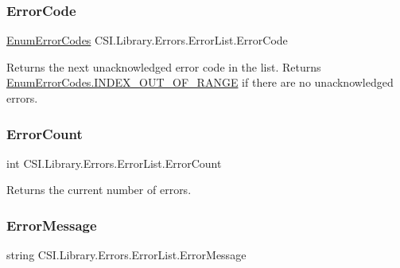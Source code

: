 \mbox{\label{class_c_s_i_1_1_library_1_1_errors_1_1_error_list_a08cc2b3cca8c52820e6258e0b14b7134}} 
\subsubsection{\texorpdfstring{ErrorCode}{ErrorCode}}
{\footnotesize\ttfamily \mbox{\hyperlink{namespace_c_s_i_1_1_library_1_1_errors_a5534735de1ef2256eb4c52c7440e30d7}{Enum\+Error\+Codes}} C\+S\+I.\+Library.\+Errors.\+Error\+List.\+Error\+Code\hspace{0.3cm}{\ttfamily [get]}}



Returns the next unacknowledged error code in the list. Returns \mbox{\hyperlink{namespace_c_s_i_1_1_library_1_1_errors_a5534735de1ef2256eb4c52c7440e30d7a577cf42cc2eae1cffef0f749c6c08787}{Enum\+Error\+Codes.\+I\+N\+D\+E\+X\+\_\+\+O\+U\+T\+\_\+\+O\+F\+\_\+\+R\+A\+N\+GE}} if there are no unacknowledged errors. 

\mbox{\label{class_c_s_i_1_1_library_1_1_errors_1_1_error_list_a6157e0500ac697bc83e93ef7bf984712}} 
\subsubsection{\texorpdfstring{ErrorCount}{ErrorCount}}
{\footnotesize\ttfamily int C\+S\+I.\+Library.\+Errors.\+Error\+List.\+Error\+Count\hspace{0.3cm}{\ttfamily [get]}}



Returns the current number of errors. 

\mbox{\label{class_c_s_i_1_1_library_1_1_errors_1_1_error_list_aac79c17f059cd69f3882177c740539c3}} 
\subsubsection{\texorpdfstring{ErrorMessage}{ErrorMessage}}
{\footnotesize\ttfamily string C\+S\+I.\+Library.\+Errors.\+Error\+List.\+Error\+Message\hspace{0.3cm}{\ttfamily [get]}}



